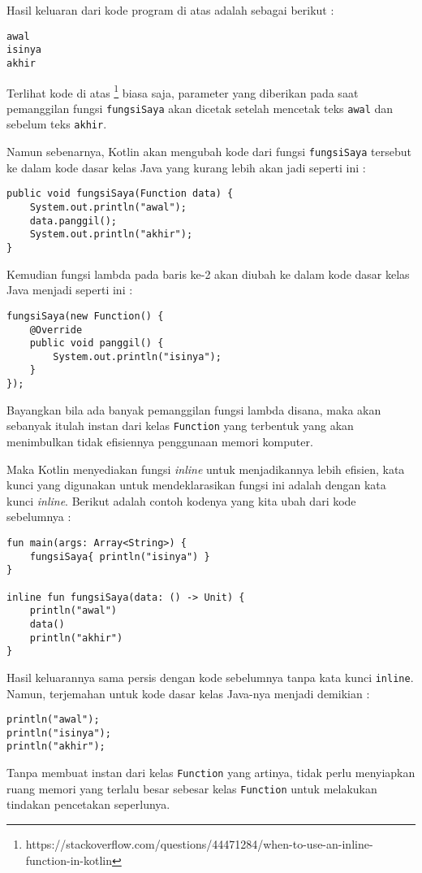 Hasil keluaran dari kode program di atas adalah sebagai berikut :

\begin{lstlisting}
awal
isinya
akhir
\end{lstlisting}

Terlihat kode di atas \footnote{https://stackoverflow.com/questions/44471284/when-to-use-an-inline-function-in-kotlin} biasa saja, parameter yang diberikan pada saat pemanggilan fungsi \texttt{fungsiSaya} akan dicetak setelah mencetak teks \texttt{awal} dan sebelum teks \texttt{akhir}.

Namun sebenarnya, Kotlin akan mengubah kode dari fungsi \texttt{fungsiSaya} tersebut ke dalam kode dasar kelas Java yang kurang lebih akan jadi seperti ini :

\begin{lstlisting}
public void fungsiSaya(Function data) {
	System.out.println("awal");
	data.panggil();
	System.out.println("akhir");
}
\end{lstlisting}

Kemudian fungsi lambda pada baris ke-2 akan diubah ke dalam kode dasar kelas Java menjadi seperti ini :

\begin{lstlisting}
fungsiSaya(new Function() {
	@Override
	public void panggil() {
		System.out.println("isinya");
	}
});
\end{lstlisting}

Bayangkan bila ada banyak pemanggilan fungsi lambda disana, maka akan sebanyak itulah instan dari kelas \texttt{Function} yang terbentuk yang akan menimbulkan tidak efisiennya penggunaan memori komputer.

Maka Kotlin menyediakan fungsi \textit{inline} untuk menjadikannya lebih efisien, kata kunci yang digunakan untuk mendeklarasikan fungsi ini adalah dengan kata kunci 
\textit{inline}. Berikut adalah contoh kodenya yang kita ubah dari kode sebelumnya :

\begin{lstlisting}
fun main(args: Array<String>) {
	fungsiSaya{ println("isinya") }
}

inline fun fungsiSaya(data: () -> Unit) {
	println("awal")
	data()
	println("akhir")
}
\end{lstlisting}

Hasil keluarannya sama persis dengan kode sebelumnya tanpa kata kunci \texttt{inline}. Namun, terjemahan untuk kode dasar kelas Java-nya menjadi demikian :

\begin{lstlisting}
println("awal");
println("isinya");
println("akhir");
\end{lstlisting}

Tanpa membuat instan dari kelas \texttt{Function} yang artinya, tidak perlu menyiapkan ruang memori yang terlalu besar sebesar kelas \texttt{Function} untuk melakukan tindakan pencetakan seperlunya.